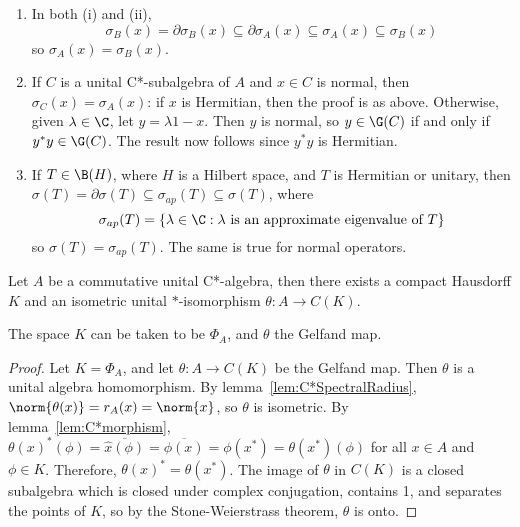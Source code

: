 \documentclass[a4paper]{article}
\begin{document}
\begin{remark}
	\begin{enumerate}[label=(\arabic*)]
		\item In both (i) and (ii),
		\[
		 \sigma_B(x)=\partial\sigma_B(x)\subseteq \partial\sigma_A(x)\subseteq \sigma_A(x)\subseteq\sigma_B(x)
		\]
		so $\sigma_A(x)=\sigma_B(x)$.
		\item If $C$ is a unital C*-subalgebra of $A$ and $x\in C$ is normal, then $\sigma_C(x)=\sigma_A(x)$: if $x$ is Hermitian, then the proof is as above. Otherwise, given $\lambda\in\C$, let $y=\lambda 1-x$. Then $y$ is normal, so $y\in\G(C)$ if and only if $y^*y\in\G(C)$. The result now follows since $y^*y$ is Hermitian.
		\item If $T\in\B(H)$, where $H$ is a Hilbert space, and $T$ is Hermitian or unitary, then $\sigma(T)=\partial\sigma(T)\subseteq\sigma_{ap}(T)\subseteq\sigma(T)$, where
		\[
		 \sigma_{ap}(T)=\{\lambda\in\C:\text{$\lambda$ is an approximate eigenvalue of $T$}\}
		\]
		so $\sigma(T)=\sigma_{ap}(T)$. The same is true for normal operators.
	\end{enumerate}
\end{remark}

\begin{nthm}\label{thm:GelfandNeimark}
  Let $A$ be a commutative unital C*-algebra, then there exists a compact Hausdorff $K$ and an isometric unital $*$-isomorphism $\theta:A\to C(K)$.

  The space $K$ can be taken to be $\Phi_A$, and $\theta$ the Gelfand map.
\end{nthm}

\begin{proof}
  Let $K=\Phi_A$, and let $\theta:A\to C(K)$ be the Gelfand map. Then $\theta$ is a unital algebra homomorphism. By lemma~\ref{lem:C*SpectralRadius}, $\norm{\theta(x)}=r_A(x)=\norm{x}$, so $\theta$ is isometric. By lemma~\ref{lem:C*morphism}, $\theta(x)^*(\phi)=\overline{\hat{x}(\phi)}=\overline{\phi(x)}=\phi(x^*)=\theta(x^*)(\phi)$ for all $x\in A$ and $\phi\in K$. Therefore, $\theta(x)^*=\theta(x^*)$. The image of $\theta$ in $C(K)$ is a closed subalgebra which is closed under complex conjugation, contains 1, and separates the points of $K$, so by the Stone-Weierstrass theorem, $\theta$ is onto.
\end{proof}
\end{document}
